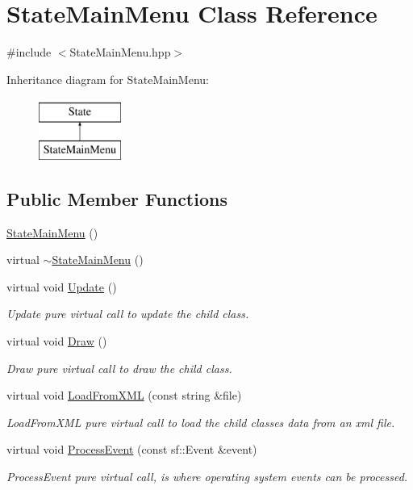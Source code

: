 \hypertarget{class_state_main_menu}{\section{State\-Main\-Menu Class Reference}
\label{class_state_main_menu}
}


{\ttfamily \#include $<$State\-Main\-Menu.\-hpp$>$}

Inheritance diagram for State\-Main\-Menu\-:\begin{figure}[H]
\begin{center}
\leavevmode
\includegraphics[height=2.000000cm]{class_state_main_menu}
\end{center}
\end{figure}
\subsection*{Public Member Functions}
\begin{DoxyCompactItemize}
\item 
\hyperlink{class_state_main_menu_af1bc1b6bfef9775a92eda9dd4c5f8d80}{State\-Main\-Menu} ()
\item 
virtual \hyperlink{class_state_main_menu_aae1ad451be64082e6e8f021d72d2050c}{$\sim$\-State\-Main\-Menu} ()
\item 
virtual void \hyperlink{class_state_main_menu_afa9c12c0975a2af95fdd2cf1829c56df}{Update} ()
\begin{DoxyCompactList}\small\item\em Update pure virtual call to update the child class. \end{DoxyCompactList}\item 
virtual void \hyperlink{class_state_main_menu_acd8b820dddbd9bd5515b1a3cebbe6978}{Draw} ()
\begin{DoxyCompactList}\small\item\em Draw pure virtual call to draw the child class. \end{DoxyCompactList}\item 
virtual void \hyperlink{class_state_main_menu_a988befa6ae7c087935581b269fb8863f}{Load\-From\-X\-M\-L} (const string \&file)
\begin{DoxyCompactList}\small\item\em Load\-From\-X\-M\-L pure virtual call to load the child classes data from an xml file. \end{DoxyCompactList}\item 
virtual void \hyperlink{class_state_main_menu_ac9a02be51b4faa9c7d82e10af97ef6e4}{Process\-Event} (const sf\-::\-Event \&event)
\begin{DoxyCompactList}\small\item\em Process\-Event pure virtual call, is where operating system events can be processed. \end{DoxyCompactList}\end{DoxyCompactItemize}
